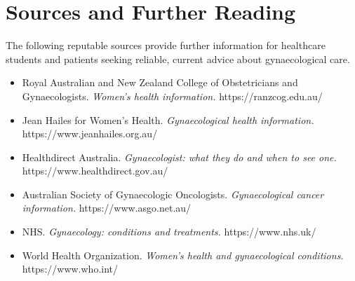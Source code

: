 \section*{Sources and Further Reading}
The following reputable sources provide further information for healthcare students and patients seeking reliable, current advice about gynaecological care.

\begin{itemize}
    \item Royal Australian and New Zealand College of Obstetricians and Gynaecologists. \textit{Women's health information.} https://ranzcog.edu.au/
    \item Jean Hailes for Women's Health. \textit{Gynaecological health information.} https://www.jeanhailes.org.au/
    \item Healthdirect Australia. \textit{Gynaecologist: what they do and when to see one.} https://www.healthdirect.gov.au/
    \item Australian Society of Gynaecologic Oncologists. \textit{Gynaecological cancer information.} https://www.asgo.net.au/
    \item NHS. \textit{Gynaecology: conditions and treatments.} https://www.nhs.uk/
    \item World Health Organization. \textit{Women's health and gynaecological conditions.} https://www.who.int/
\end{itemize}
